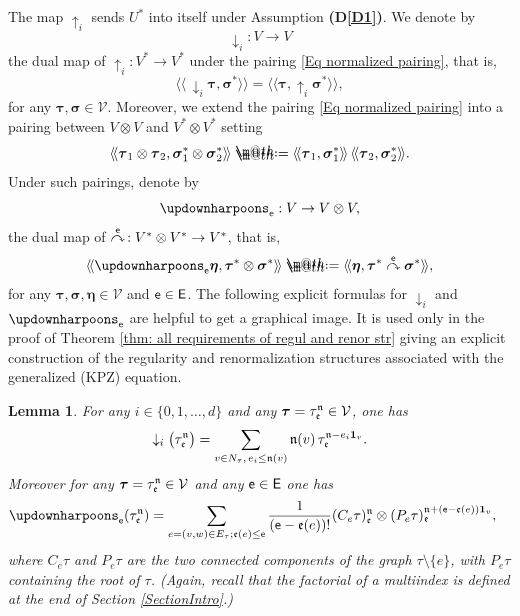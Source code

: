 \documentclass[10pt, reqno]{amsart}
\makeatletter
\numberwithin{subsection}{section}
\numberwithin{subsubsection}{subsection}
\numberwithin{equation}{section} %
\theoremstyle{mystyle}
\newtheorem{lem}[thm]{\hspace{-0.14cm}  {Lemma} }%
\theoremstyle{mystyle2}
\theoremstyle{mystyle3}
\newcommand{\refD}[1]{\textbf{\textsf{(D\ref{#1})}}}
\newcommand{\bstau}{\boldsymbol{\tau}}
\newcommand{\bssigma}{\boldsymbol{\sigma}}
\newcommand{\bseta}{\boldsymbol{\eta}}
\newcommand{\wangle}[1]{\langle\!\langle#1\rangle\!\rangle}
\newcommand{\grafting}{\overset{\sf e}{\curvearrowright}}
\newcommand\mcV{\mathcal V}
\newcommand*{\defeq}{\mathrel{\rlap{%
                     \raisebox{0.3ex}{$\m@th\cdot$}}%
                     \raisebox{-0.3ex}{$\m@th\cdot$}}%
                     =}
\makeatother
\begin{document}
The map $\uparrow_i$ sends $U^*$ into itself under Assumption \refD{D1}. We denote by
$$
\downarrow_i:V\to V
$$
the dual map of $\uparrow_i:V^*\to V^*$ under the pairing \eqref{Eq normalized pairing}, that is, 
$$
\wangle{\,\downarrow_i\bstau,\bssigma^*}=\wangle{\bstau,\uparrow_i\bssigma^*},
$$
for any $\bstau,\bssigma\in\mcV$.
Moreover, we extend the pairing \eqref{Eq normalized pairing} into a pairing between $V\otimes V$ and $V^*\otimes V^*$ setting
$$
\wangle{\bstau_1\otimes\bstau_2,\bssigma_1^*\otimes\bssigma_2^*} \defeq  \wangle{\bstau_1,\bssigma_1^*}\,\wangle{\bstau_2,\bssigma_2^*}.
$$
Under such pairings, denote by 
$$
\updownharpoons_{\sf e} : V\rightarrow V\otimes V,
$$ 
the dual map of $\grafting\,:V^*\otimes V^*\to V^*$, that is,
\begin{align}\label{section 6:dual}
\wangle{\updownharpoons_{\sf e}\bseta, \bstau^*\otimes\bssigma^*} \defeq  \wangle{\bseta, \bstau^*\grafting\bssigma^*},
\end{align}
for any $\bstau,\bssigma,\bseta\in\mcV$ and ${\sf e}\in \sf E$. The following explicit formulas for $\downarrow_i$ and $\updownharpoons_{\sf e}$ are 
helpful to get a graphical image. It is used only in the proof of Theorem 
\ref{thm: all requirements of regul and renor str} giving an explicit construction of the regularity and renormalization structures associated with the generalized (KPZ) equation.

\medskip

\begin{lem}\label{lem:dual between graft and cut}
For any $i\in\{0,1,\dots,d\}$ and any $\bstau=\tau_{\frak{e}}^{\frak{n}}\in\mcV$, one has
\begin{align*}
\downarrow_i\big(\tau_{\frak{e}}^{\frak{n}}\big) = \sum_{v\in N_\tau,\, 
e_i\le \frak{n}(v)}\frak{n}(v)\,\tau_{\frak{e}}^{\frak{n}-e_i\mathbf{1}_v}.
\end{align*}
Moreover for any $\bstau=\tau_{\frak{e}}^{\frak{n}}\in\mcV$ and any $\sf e\in E$ one has
\begin{align}\label{section6:defofcut}
\updownharpoons_{\sf e}(\tau_{\frak{e}}^{\frak{n}})
&=\sum_{e=(v,w)\in E_\tau; \frak{e}(e)\le {\sf e}}
\frac1{({\sf e}-\frak{e}(e))!}
(C_e\tau)_{\frak{e}}^{\frak{n}}
\otimes (P_e\tau)_{\frak{e}}^{\frak{n}+({\sf e}-\frak{e}(e)){\bf1}_v},
\end{align}
where $C_e\tau$ and $P_e\tau$ are the two connected components of the graph $\tau\setminus\{e\}$, with $P_e\tau$ containing the root of $\tau$.
(Again, recall that the factorial of a multiindex is defined at the end of Section \ref{SectionIntro}.)
\end{lem}
\end{document}
